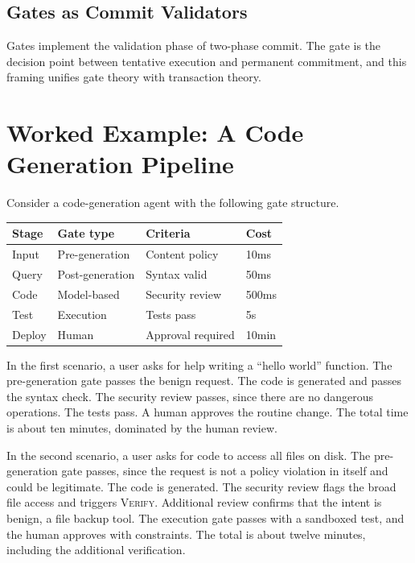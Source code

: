 \documentclass[11pt]{book}
\begin{document}
\subsection{Gates as Commit Validators}

Gates implement the validation phase of two-phase commit. The gate is the decision point between tentative execution and permanent commitment, and this framing unifies gate theory with transaction theory.

\section{Worked Example: A Code Generation Pipeline}

Consider a code-generation agent with the following gate structure.

\begin{center}
\begin{tabular}{llll}
\toprule
Stage & Gate type & Criteria & Cost \\
\midrule
Input & Pre-generation & Content policy & 10ms \\
Query & Post-generation & Syntax valid & 50ms \\
Code & Model-based & Security review & 500ms \\
Test & Execution & Tests pass & 5s \\
Deploy & Human & Approval required & 10min \\
\bottomrule
\end{tabular}
\end{center}

In the first scenario, a user asks for help writing a ``hello world'' function. The pre-generation gate passes the benign request. The code is generated and passes the syntax check. The security review passes, since there are no dangerous operations. The tests pass. A human approves the routine change. The total time is about ten minutes, dominated by the human review.

In the second scenario, a user asks for code to access all files on disk. The pre-generation gate passes, since the request is not a policy violation in itself and could be legitimate. The code is generated. The security review flags the broad file access and triggers \textsc{Verify}. Additional review confirms that the intent is benign, a file backup tool. The execution gate passes with a sandboxed test, and the human approves with constraints. The total is about twelve minutes, including the additional verification.
\end{document}
